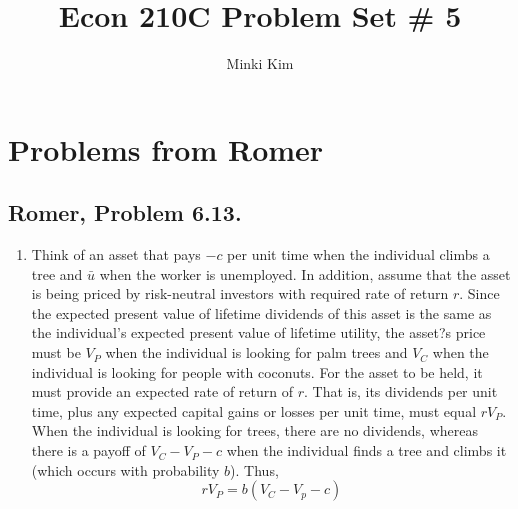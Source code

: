 \documentclass[11pt]{amsart}
\title{Econ 210C Problem Set \# 5}
\author{Minki Kim}
\begin{document}
\maketitle

\section{Problems from Romer}
\subsection{Romer, Problem 6.13.}
\begin{enumerate}[label = (\alph*)]
	\item Think of an asset that pays $-c$ per unit time when the individual climbs a tree and $\bar{u}$ when the worker is unemployed. 
	In addition, assume that the asset is being priced by risk-neutral investors with required rate of return $r$. 
	Since the expected present value of lifetime dividends of this asset is the same as the individual's expected present value of lifetime utility, the asset?s price must be $V_P$ when the individual is looking for palm trees and $V_C$ when the individual is looking for people with coconuts. 
	For the asset to be held, it must provide an expected rate of return of $r$. 
	That is, its dividends per unit time, plus any expected capital gains or losses per unit time, must equal $rV_P$.
	When the individual is looking for trees, there are no dividends, whereas there is a payoff of $V_C - V_P - c$ when the individual finds a tree and climbs it (which occurs with probability $b$). 
	Thus,
	\[
	r V_P = b(V_C - V_p - c)
	\]


\end{enumerate}
\end{document}
